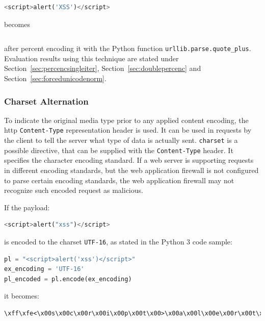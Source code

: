 \begin{lstlisting}[style=basicStyle, language=Python]
<script>alert('XSS')</script>
\end{lstlisting}

becomes

\begin{lstlisting}[style=basicStyle, language=Python]
%3Cscript%3Ealert%28%27XSS%27%29%3C%2Fscript%3E
\end{lstlisting}

after percent encoding it with the Python function \verb|urllib.parse.quote_plus|. Evaluation results using this technique are stated under Section~\ref{sec:percencsingleiter}, Section~\ref{sec:doublepercenc} and Section~\ref{sec:forcedunicodenorm}.


\subsubsection{Charset Alternation}
\label{sec:charsetalt}
To indicate the original media type prior to any applied content encoding, the \acrshort{http} \verb|Content-Type| representation header is used.
It can be used in requests by the client to tell the server what type of data is actually sent.
\verb|charset| is a possible directive, that can be supplied with the \verb|Content-Type| header.
It specifies the character encoding standard. \cite{http/contenttype}
If a web server is supporting requests in different encoding standards, but the web application firewall is not configured to parse certain encoding standards, the web application firewall may not recognize such encoded request as malicious.

If the payload:

\begin{lstlisting}[style=basicStyle, language=Python]
<script>alert("xss")</script>
\end{lstlisting}

is encoded to the charset \verb|UTF-16|, as stated in the Python 3 code sample:

\begin{lstlisting}[style=basicStyle, language=Python]
pl = "<script>alert('xss')</script>"
ex_encoding = 'UTF-16'
pl_encoded = pl.encode(ex_encoding)
\end{lstlisting}

it becomes:

\begin{lstlisting}[style=basicStyle]
\xff\xfe<\x00s\x00c\x00r\x00i\x00p\x00t\x00>\x00a\x00l\x00e\x00r\x00t\x00(\x00'\x00x\x00s\x00s\x00'\x00)\x00<\x00/\x00s\x00c\x00r\x00i\x00p\x00t\x00>\x00
\end{lstlisting}

